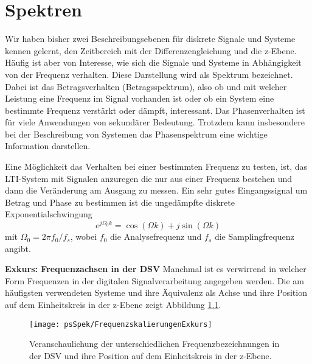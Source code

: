 \chapter{Spektren}
Wir haben bisher zwei Beschreibungsebenen für diskrete Signale und
Systeme kennen gelernt, den Zeitbereich mit der
Differenzengleichung und die z-Ebene. Häufig ist aber von
Interesse, wie sich die Signale und Systeme in Abhängigkeit von
der Frequenz verhalten. Diese Darstellung wird als Spektrum
bezeichnet. Dabei ist das Betragsverhalten (Betragsspektrum), also
ob und mit welcher Leistung eine Frequenz im Signal vorhanden ist
oder ob ein System eine bestimmte Frequenz verstärkt oder dämpft,
interessant. Das Phasenverhalten ist für viele Anwendungen von
sekundärer Bedeutung. Trotzdem kann insbesondere bei der
Beschreibung von Systemen das Phasenspektrum eine wichtige
Information darstellen.



Eine Möglichkeit das Verhalten bei einer bestimmten Frequenz zu
testen, ist, das LTI-System mit Signalen anzuregen die nur aus
einer Frequenz bestehen und dann die Veränderung am Ausgang zu
messen. Ein sehr gutes Eingangssignal um Betrag und Phase zu
bestimmen ist die ungedämpfte diskrete Exponentialschwingung
\begin{equation}\label{eq:Def:Euler}
    e^{j\Omega_0 k} = \cos(\Omega k)+j\sin(\Omega k)
\end{equation}
mit $\Omega_0 = 2 \pi f_0/ f_s$, wobei $f_0$ die Analysefrequenz und
$f_s$ die Samplingfrequenz angibt.

\hspace{1cm}\begin{minipage}{10cm}
{\bf Exkurs: Frequenzachsen in der DSV}
Manchmal ist es verwirrend in welcher Form Frequenzen in der
digitalen Signalverarbeitung angegeben werden. Die am häufigsten verwendeten Systeme
und ihre Äquivalenz als Achse und ihre Position auf dem Einheitskreis in der z-Ebene zeigt
Abbildung \ref{pic:FrequenzenDSV}.
\begin{figure}[H]
\begin{center}
\texttt{[image: psSpek/FrequenzskalierungenExkurs]}
\caption{\label{pic:FrequenzenDSV}Veranschaulichung der unterschiedlichen Frequenzbezeichnungen
in der DSV und ihre Position auf dem Einheitskreis in der z-Ebene.}
\end{center}
\end{figure}
\end{minipage}

